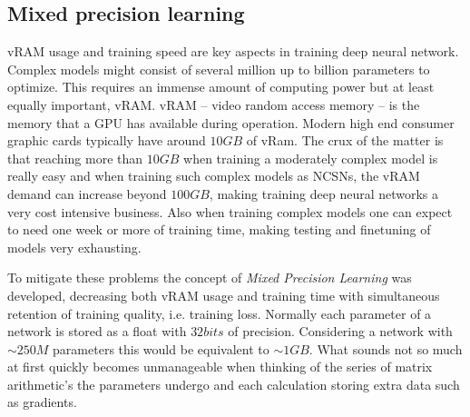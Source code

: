 \subsection{Mixed precision learning} %
vRAM usage and training speed are key aspects in training deep neural network. Complex models might consist of several million up to billion parameters to optimize. This requires an immense amount of computing power but at least equally important, vRAM. vRAM – video random access memory – is the memory that a GPU has available during operation. Modern high end consumer graphic cards typically have around $10GB$ of vRam. The crux of the matter is that reaching more than $10GB$ when training a moderately complex model is really easy and when training such complex models as NCSNs, the vRAM demand can increase beyond $100GB$, making training deep neural networks a very cost intensive business. Also when training complex models one can expect to need one week or more of training time, making testing and finetuning of models very exhausting.

To mitigate these problems the concept of \textit{Mixed Precision Learning} \cite{mixed_prec} was developed, decreasing both vRAM usage and training time with simultaneous retention of training quality, i.e. training loss. Normally each parameter of a network is stored as a float with $32bits$ of precision. Considering a network with $\sim250M$ parameters this would be equivalent to $\sim1GB$. What sounds not so much at first quickly becomes unmanageable when thinking of the series of matrix arithmetic's the parameters undergo and each calculation storing extra data such as gradients. 

